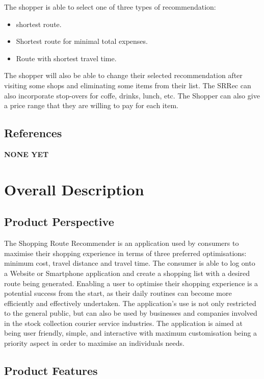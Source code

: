 \documentclass[10pt, a4paper, twocolumn]{scrartcl}
\begin{document}
			The shopper is able to select one of three types of recommendation:
			\begin{itemize}
				\item shortest route.
				\item Shortest route for minimal total expenses.
				\item Route with shortest travel time.
			\end{itemize}
		
			The shopper will also be able to change their selected recommendation after visiting some shops and eliminating some items from their list. The SRRec can also incorporate stop-overs for coffe, drinks, lunch, etc. The Shopper can also give a price range that they are willing to pay for each item.
		
		\subsection{References}
		
			\textbf{NONE YET}
	
	\section{Overall Description}
	
		\subsection{Product Perspective}
	
			The Shopping Route Recommender is an application used by consumers to maximise their shopping experience in terms of three preferred optimisations: minimum cost, travel distance and travel time. The consumer is able to log onto a Website or Smartphone application and create a shopping list with a desired route being generated.  Enabling a user to optimise their shopping experience is a potential success from the start, as their daily routines can become more efficiently and effectively undertaken. The application's use is not only restricted to the general public, but can also be used by businesses and companies involved in the stock collection courier service industries. The application is aimed at being user friendly, simple, and interactive with maximum customisation being a priority aspect in order to maximise an individuals needs. 
	
		\subsection{Product Features}
	
\end{document}
